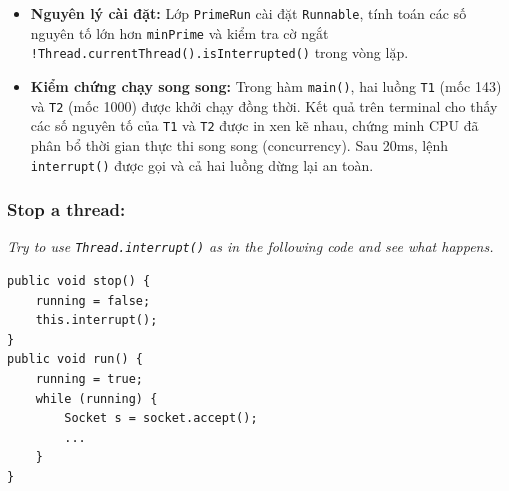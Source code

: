 \documentclass[11pt,a4paper]{article}
\begin{document}
\begin{solutionbox}[title=Báo cáo \& Bài làm: Lập trình Đa luồng (PrimeRun.java)]
\begin{itemize}
    \item \textbf{Nguyên lý cài đặt:} Lớp \texttt{PrimeRun} cài đặt \texttt{Runnable}, tính toán các số nguyên tố lớn hơn \texttt{minPrime} và kiểm tra cờ ngắt \texttt{!Thread.currentThread().isInterrupted()} trong vòng lặp.
    \item \textbf{Kiểm chứng chạy song song:} Trong hàm \texttt{main()}, hai luồng \texttt{T1} (mốc 143) và \texttt{T2} (mốc 1000) được khởi chạy đồng thời. Kết quả trên terminal cho thấy các số nguyên tố của \texttt{T1} và \texttt{T2} được in xen kẽ nhau, chứng minh CPU đã phân bổ thời gian thực thi song song (concurrency). Sau 20ms, lệnh \texttt{interrupt()} được gọi và cả hai luồng dừng lại an toàn.
\end{itemize}
\end{solutionbox}

\newpage 

\subsubsection*{Stop a thread:}
\noindent\textit{Try to use \texttt{Thread.interrupt()} as in the following code and see what happens.}
\begin{lstlisting}
public void stop() {
    running = false;
    this.interrupt();
}
public void run() {
    running = true;
    while (running) {
        Socket s = socket.accept();
        ...
    }
}
\end{lstlisting}
\end{document}
